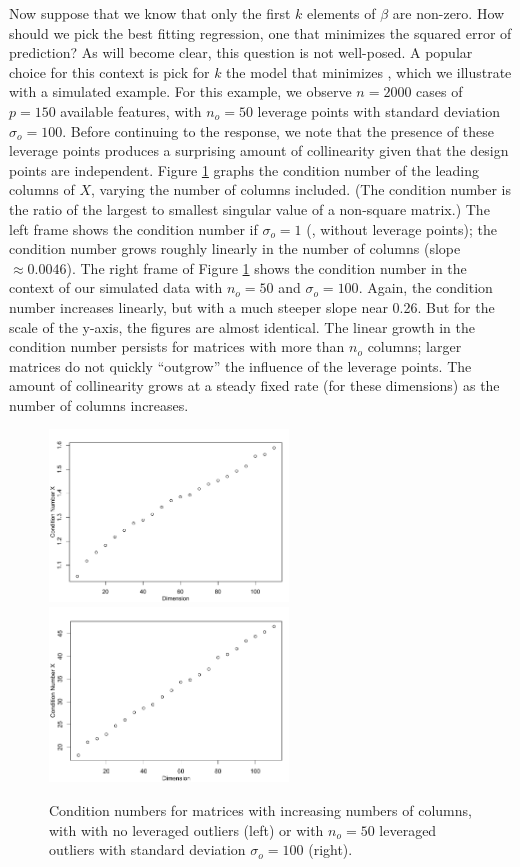 \documentclass[12pt]{article}
\begin{document}
 Now suppose that we know that only the first $k$ elements of $\beta$ are
 non-zero.  How should we pick the best fitting regression, one that minimizes
 the squared error of prediction?  As will become clear, this question is not
 well-posed.  A popular choice for this context is pick for $k$ the model that
 minimizes \aic, which we illustrate with a simulated example.  For this
 example, we observe $n = 2000$ cases of $p = 150$ available features, with
 $n_o=50$ leverage points with standard deviation $\sigma_o = 100$.  Before
 continuing to the response, we note that the presence of these leverage points
 produces a surprising amount of collinearity given that the design points are
 independent.  Figure \ref{fig:cn} graphs the condition number of the leading
 columns of $X$, varying the number of columns included.  (The condition number
 is the ratio of the largest to smallest singular value of a non-square matrix.)
  The left frame shows the condition number if $\sigma_o = 1$ (\ie, without
 leverage points); the condition number grows roughly linearly in the number of
 columns (slope $\approx 0.0046$).  The right frame of Figure \ref{fig:cn} shows
 the condition number in the context of our simulated data with $n_o = 50$ and
 $\sigma_o = 100$.  Again, the condition number increases linearly, but with a
 much steeper slope near 0.26.  But for the scale of the y-axis, the figures are
 almost identical.  The linear growth in the condition number persists for
 matrices with more than $n_o$ columns; larger matrices do not quickly
 ``outgrow'' the influence of the leverage points.  The amount of collinearity
 grows at a steady fixed rate (for these dimensions) as the number of columns
 increases.

 \begin{figure}
 \caption{ Condition numbers for matrices with increasing numbers of columns,
 with with no leveraged outliers (left) or with $n_o=50$ leveraged outliers with
 standard deviation $\sigma_o=100$ (right). } 
 \label{fig:cn}
 \centerline{\includegraphics[width=2.5in]{figures/cn1.pdf}
             \includegraphics[width=2.5in]{figures/cn100.pdf}}
 \end{figure}
\end{document}
